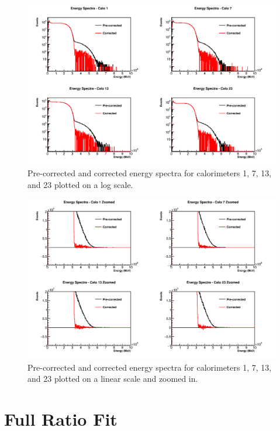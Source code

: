 	\begin{figure}[]
		\centering
		\includegraphics[width=.8\textwidth]{CaloEnergies}
	    \caption[CaloEnergies]{Pre-corrected and corrected energy spectra for calorimeters 1, 7, 13, and 23 plotted on a log scale.}    
	    \label{fig:CaloEnergies}
	\end{figure}

	\begin{figure}[]
		\centering
		\includegraphics[width=.8\textwidth]{CaloEnergiesZoomed}
	    \caption[CaloEnergiesZoomed]{Pre-corrected and corrected energy spectra for calorimeters 1, 7, 13, and 23 plotted on a linear scale and zoomed in.}    
	    \label{fig:CaloEnergiesZoomed}
	\end{figure}

\clearpage

\section{Full Ratio Fit}

